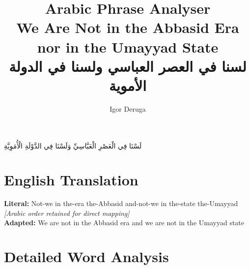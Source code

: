 \documentclass[letterpaper,12pt]{article}
\begin{document}
\title{\textbf{\Large Arabic Phrase Analyser}\\
\large We Are Not in the Abbasid Era nor in the Umayyad State\\
\normalsize \textarabic{لسنا في العصر العباسي ولسنا في الدولة الأموية}}
\author{Igor Deruga}
\date{}
\maketitle

\begin{tcolorbox}[colback=boxcolor,colframe=headercolor,title=\textbf{Arabic Phrase with Full Diacritics},breakable]
\centering
\Large\textarabic{لَسْنَا فِي الْعَصْرِ الْعَبَّاسِيِّ وَلَسْنَا فِي الدَّوْلَةِ الْأُمَوِيَّةِ}
\end{tcolorbox}

\section{English Translation}
\begin{tcolorbox}[colback=white,colframe=accentcolor,breakable]
\textbf{Literal:} Not-we in the-era the-Abbasid and-not-we in the-state the-Umayyad\\
\textit{[Arabic order retained for direct mapping]}\\[0.5em]
\textbf{Adapted:} We are not in the Abbasid era and we are not in the Umayyad state
\end{tcolorbox}

\section{Detailed Word Analysis}
\end{document}

